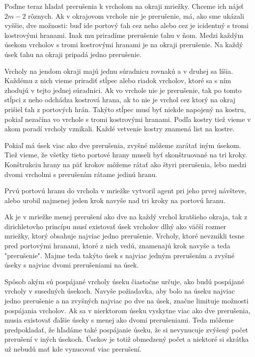 Poďme teraz hľadať prerušenia k vrcholom na  okraji mriežky. 
Chceme ich nájsť $2m - 2$ rôznych. Ak
v okrajovom vrchole nie je prerušenie, má, ako sme ukázali vyššie, 
dve možnosti: 
buď ide portový ťah cez neho alebo cez je icidentný s tromi kostrovými
hranami. Inak mu priradíme prerušenie ťahu v ňom. Medzi každým úsekom
vrcholov s tromi kostrovými hranami je na okraji prerušenie. Na každý úsek
ťahu na okraji pripadá jedno prerušenie.

Vrcholy na jendom okraji majú jednu súradnicu rovnakú a v druhej sa líšia.
Každému z nich vieme priradiť stĺpec alebo riadok vrcholov, ktoré sa s ním
zhodujú v tejto jednej súradnici. Ak vo vrchole nie je prerušenie, tak po
tomto stĺpci z neho odchádza kostrová hrana, ak to nie je vrchol cez ktorý na
okraj prišiel ťah z portových hrán. Takýto stĺpec musí byť niekde napojený
na kostru, pokiaľ nezačína vo vrchole s tromi kostrovými hranami. Podľa
kostry tiež vieme v akom poradí vrcholy vznikali. Každé vetvenie kostry
znamená list na kostre.

Pokiaľ má úsek viac ako dve prerušenia, zvyšné môžeme zarátať iným úsekom.
Tiež vieme, že všetky tieto portové hrany museli byť skonštruované na tri kroky.
Konštrukciu hrany na päť krokov môžeme rátať ako štyri prerušenia, lebo
medzi dvomi vrcholmi s prerušením rátame jedinú hranu.

Prvú portovú hranu do vrchola v mriežke vytvoril agent pri jeho prvej
návšteve, alebo urobil najmenej jeden krok navyše nad tri kroky na portovú
hranu.

Ak je v mriežke menej prerušení ako dve na každý vrchol kratšieho okraja,
tak z dirichletovho princípu musí existovať úsek vrcholov dlhý ako väčší
rozmer mriežky, ktorý obsahuje najviac jedno prerušenie.
Vrcholy, ktoré nevznikli tesne pred portovými hranami, ktoré z nich vedú,
znamenajú krok navyše a teda "prerušenie". Majme teda takýto úsek s najviac
jedným prerušením a zvyšné úseky s najviac dvomi prerušeniami na úsek.

Spôsob akým sú pospájané vrcholy úseku čiastočne určuje, ako budú pospájané
vrcholy v susedných úsekoch. Navyše požiadavka, aby bolo na úseku najviac
jedno prerušenie a na zvyšných najviac po dve na úsek, značne limituje
možnosti pospájania vrcholov.
Ak sa v nierktorom úseku vyskytne viac ako dve prerušenia, musia existovať
ďalšie úseky s menej ako dvomi prerušeniami. Teda môžeme predpokladať, že
hľadáme také pospájanie úseku, že si nevynucuje zvýšený počet prerušení v
iných úsekoch. Úsekov je totiž obmedzený počet a niektoré si skrátka už
nebudú mať kde vynucovať viac prerušení.

